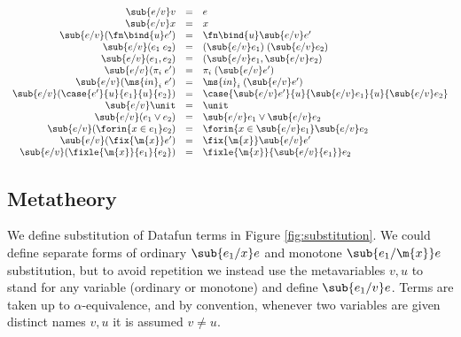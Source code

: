 

\begin{figure*}
  \[\begin{array}{rcll}
    \sub{e/v} v &=& e\\
    \sub{e/v} x &=& x\\
    \sub{e/v} (\fn\bind{u} e') &=& \fn\bind{u} \sub{e/v} e'\\
    \sub{e/v} (e_1 \;e_2) &=& (\sub{e/v} e_1)\;(\sub{e/v} e_2)\\
    \sub{e/v} (e_1, e_2) &=& (\sub{e/v} e_1, \sub{e/v} e_2)\\
    \sub{e/v} (\pi_i\;e') &=& \pi_i\;(\sub{e/v}e')\\
    \sub{e/v} (\ms{in}_i\;e') &=& \ms{in}_i \;(\sub{e/v} e')\\
    \sub{e/v} (\case{e'}{u}{e_1}{u}{e_2})
    &=& \case{\sub{e/v} e'}{u}{\sub{e/v} e_1}{u}{\sub{e/v} e_2}\\
    \sub{e/v} \unit &=& \unit\\
    \sub{e/v} (e_1 \vee e_2) &=& \sub{e/v} e_1 \vee \sub{e/v} e_2\\
    \sub{e/v} (\forin{x \in e_1} e_2)
    &=& \forin{x \in \sub{e/v} e_1} \sub{e/v} e_2\\
    \sub{e/v} (\fix{\m{x}} e') &=& \fix{\m{x}} \sub{e/v} e'\\
    \sub{e/v} (\fixle{\m{x}}{e_1}{e_2}) &=& \fixle{\m{x}}{\sub{e/v}{e_1}} e_2
  \end{array}\]
  \caption{Substitution}
  \label{fig:substitution}
\end{figure*}


\subsection{Metatheory}

We define substitution of Datafun terms in Figure \ref{fig:substitution}. We
could define separate forms of ordinary $\sub{e_1/x} e$ and monotone
$\sub{e_1/\m{x}} e$ substitution, but to avoid repetition we instead use the
metavariables $v,u$ to stand for any variable (ordinary or monotone) and define
$\sub{e_1/v} e$. Terms are taken up to $\alpha$-equivalence, and by convention,
whenever two variables are given distinct names $v,u$ it is assumed $v \ne u$.

